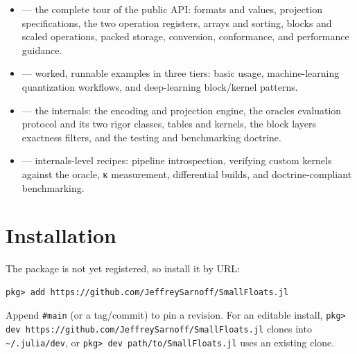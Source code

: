 \label{9854230807696872180}{}


\begin{itemize}
\item \textbf{} — the complete tour of the public API: formats and values, projection specifications, the two operation registers, arrays and sorting, blocks and scaled operations, packed storage, conversion, conformance, and performance guidance.


\item \textbf{} — worked, runnable examples in three tiers: basic usage, machine-learning quantization workflows, and deep-learning block/kernel patterns.


\item \textbf{} — the internals: the encoding and projection engine, the oracle{\textquotesingle}s evaluation protocol and its two rigor classes, tables and kernels, the block layer{\textquotesingle}s exactness filters, and the testing and benchmarking doctrine.


\item \textbf{} — internals-level recipes: pipeline introspection, verifying custom kernels against the oracle, κ measurement, differential builds, and doctrine-compliant benchmarking.

\end{itemize}


\section{Installation}



\label{16848947351613073531}{}


The package is not yet registered, so install it by URL:




\begin{verbatim}
pkg> add https://github.com/JeffreySarnoff/SmallFloats.jl
\end{verbatim}



Append \texttt{\#main} (or a tag/commit) to pin a revision. For an editable install, \texttt{pkg> dev https://github.com/JeffreySarnoff/SmallFloats.jl} clones into \texttt{{\textasciitilde}/.julia/dev}, or \texttt{pkg> dev path/to/SmallFloats.jl} uses an existing clone.



